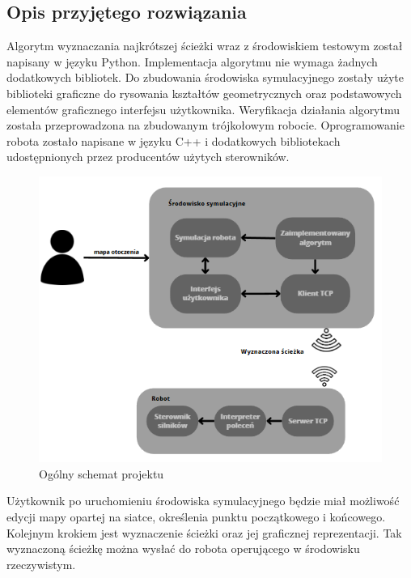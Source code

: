 \subsection{Opis przyjętego rozwiązania}
Algorytm wyznaczania najkrótszej ścieżki wraz z środowiskiem testowym został napisany w języku Python.
Implementacja algorytmu nie wymaga żadnych dodatkowych bibliotek. Do zbudowania środowiska symulacyjnego 
zostały użyte biblioteki graficzne do rysowania kształtów geometrycznych oraz podstawowych elementów graficznego 
interfejsu użytkownika. 
Weryfikacja działania algorytmu  została przeprowadzona na zbudowanym trójkołowym robocie.
Oprogramowanie robota zostało napisane w języku C++ i dodatkowych bibliotekach udostępnionych przez producentów użytych sterowników.

\begin{figure}[H]
	\centering
	\includegraphics[width=14cm]{pages/literatura/zdjecia/schematOgolny.png}
	\caption{Ogólny schemat projektu}
	\label{sch:ogolnyRozwiazania}
\end{figure}

Użytkownik po uruchomieniu środowiska symulacyjnego będzie miał możliwość edycji mapy opartej na siatce, określenia punktu początkowego i końcowego.
Kolejnym krokiem jest wyznaczenie ścieżki oraz jej graficznej reprezentacji. Tak wyznaczoną ścieżkę można wysłać do robota 
operującego w środowisku rzeczywistym. 
